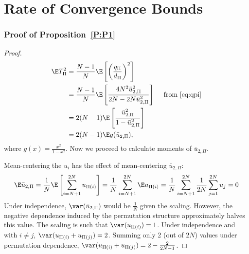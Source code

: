 \chapter{Rate of Convergence Bounds}
\label{A:stein-proof-app}
\subsection{Proof of Proposition~\ref{P:P1}}
\begin{proof}
  \begin{align}
    \E T_{\Pi}^2
    &= \frac{N-1}{N} \E \left [ \left ( \frac{q_\Pi}{d_\Pi} \right )^2 \right ] \\
    &= \frac{N-1}{N} \E \left [\frac{
        4 N^2\bar{u}_{2,\Pi}^2}{2N-2N\bar{u}_{2,\Pi}^2} \right ] \quad \text{ from } \eqref{eq:qpi}
    \nonumber \\
    &= 2(N-1)\E \left [\frac{
        \bar{u}_{2,\Pi}^2}{1-\bar{u}_{2,\Pi}^2} \right ] \nonumber \\
    &= 2(N-1) \E g(\bar{u}_{2,\Pi}), \label{def:varT}
  \end{align}
  where $g(x) = \frac{x^2}{1-x^2}$. Now we proceed to calculate moments of $\bar{u}_{2,\Pi}$.

  Mean-centering the $u_{i}$ has the effect of mean-centering $\bar{u}_{2,\Pi}$:
  \begin{equation*}
    \E \bar{u}_{2,\Pi} =
    \frac{1}{N} \E \left [ \sum_{i=N+1}^{2N} u_{\Pi(i)} \right ] =
    \frac{1}{N} \sum_{i=N+1}^{2N} \E u_{\Pi(i)} =
    \frac{1}{N} \sum_{i=N+1}^{2N} \frac{1}{2N} \sum_{j=1}^{2N} u_{j} = 0
  \end{equation*}
  Under independence, $\var(\bar{u}_{2,\Pi})$ would be $\frac{1}{N}$ given
  the scaling.  However, the negative dependence induced by the
  permutation structure approximately halves this value.
  The scaling is such that $\var(u_{\Pi(i)}) = 1$.  Under independence and
  with $i \neq j$, $\var(u_{\Pi(i)} + u_{\Pi(j)}) = 2$.  Summing only 2 (out of $2N$)
  values under permutation dependence, $\var(u_{\Pi(i)} + u_{\Pi(j)}) = 2 - \frac{2}{2N-1}$.


\end{proof}
